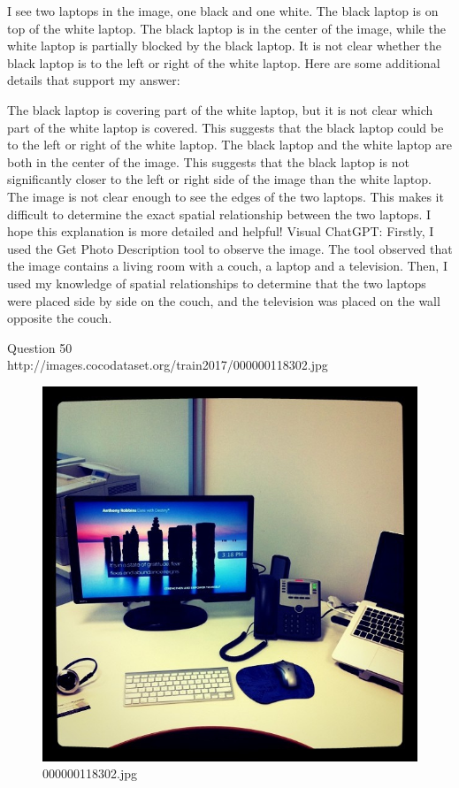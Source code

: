 \begin{enumerate}
    I see two laptops in the image, one black and one white.
    The black laptop is on top of the white laptop.
    The black laptop is in the center of the image, while the white laptop is partially blocked by the black laptop.
    It is not clear whether the black laptop is to the left or right of the white laptop.
    Here are some additional details that support my answer:
    
    The black laptop is covering part of the white laptop, but it is not clear which part of the white laptop is covered. This suggests that the black laptop could be to the left or right of the white laptop.
    The black laptop and the white laptop are both in the center of the image. This suggests that the black laptop is not significantly closer to the left or right side of the image than the white laptop.
    The image is not clear enough to see the edges of the two laptops. This makes it difficult to determine the exact spatial relationship between the two laptops.
    I hope this explanation is more detailed and helpful!
    \subitem Visual ChatGPT: Firstly, I used the Get Photo Description tool to observe the image. The tool observed that the image contains a living room with a couch, a laptop and a television. Then, I used my knowledge of spatial relationships to determine that the two laptops were placed side by side on the couch, and the television was placed on the wall opposite the couch.
\end{enumerate}
Question 50\\
http://images.cocodataset.org/train2017/000000118302.jpg
\begin{figure}[h]
    \centering
    \includegraphics[width=0.8\linewidth]{../image set/hard/000000118302.jpg}
    \caption{000000118302.jpg}
\end{figure}
